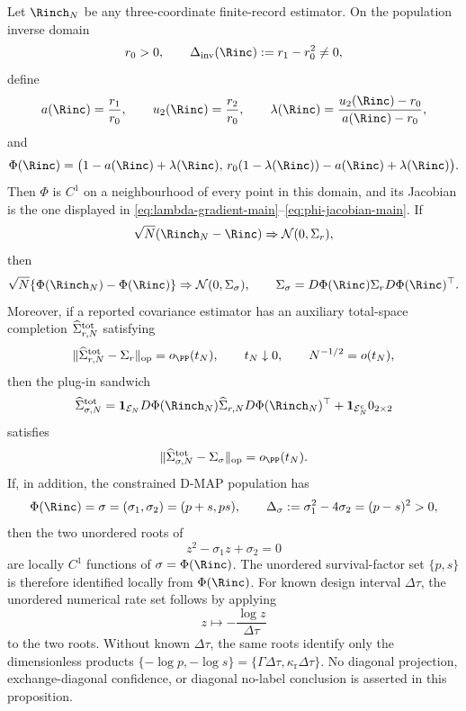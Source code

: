 \begin{proposition}\label{prop:finite-record-pre-diagonal-quotient-rule-main}
Let \(\Rinch_N\) be any three-coordinate finite-record estimator.  On the
population inverse domain
\[
r_0>0,\qquad \Delta_{\mathrm{inv}}(\Rinc):=r_1-r_0^2\ne0,
\]
define
\[
a(\Rinc)=\frac{r_1}{r_0},\qquad
u_2(\Rinc)=\frac{r_2}{r_0},\qquad
\lambda(\Rinc)=\frac{u_2(\Rinc)-r_0}{a(\Rinc)-r_0},
\]
and
\begin{equation}\label{eq:finite-inverse-delta-map-main}
\Phi(\Rinc)=
\bigl(1-a(\Rinc)+\lambda(\Rinc),\,
r_0(1-\lambda(\Rinc))-a(\Rinc)+\lambda(\Rinc)\bigr).
\end{equation}
Then \(\Phi\) is \(C^1\) on a neighbourhood of every point in this domain, and
its Jacobian is the one displayed in
\eqref{eq:lambda-gradient-main}--\eqref{eq:phi-jacobian-main}.  If
\[
\sqrt N(\Rinch_N-\Rinc)\Rightarrow \mathcal N(0,\Sigma_r),
\]
then
\[
\sqrt N\{\Phi(\Rinch_N)-\Phi(\Rinc)\}
\Rightarrow
\mathcal N(0,\Sigma_{\sigma}),\qquad
\Sigma_{\sigma}=D\Phi(\Rinc)\Sigma_rD\Phi(\Rinc)^\top .
\]
Moreover, if a reported covariance estimator has an auxiliary total-space
completion \(\widehat\Sigma_{r,N}^{\rm tot}\) satisfying
\[
\|\widehat\Sigma_{r,N}^{\rm tot}-\Sigma_r\|_{\operatorname{op}}=o_{\PP}(t_N),
\qquad t_N\downarrow0,\qquad N^{-1/2}=o(t_N),
\]
then the plug-in sandwich
\[
\widehat\Sigma_{\sigma,N}^{\rm tot}
=\mathbf1_{\mathcal E_N}
D\Phi(\Rinch_N)\widehat\Sigma_{r,N}D\Phi(\Rinch_N)^\top
+\mathbf1_{\mathcal E_N^c}0_{2\times2}
\]
satisfies
\[
\|\widehat\Sigma_{\sigma,N}^{\rm tot}-\Sigma_{\sigma}\|_{\operatorname{op}}
=o_{\PP}(t_N).
\]
If, in addition, the constrained D-MAP population has
\[
\Phi(\Rinc)=\sigma=(\sigma_1,\sigma_2)=(p+s,ps),
\qquad
\Delta_\sigma:=\sigma_1^2-4\sigma_2=(p-s)^2>0,
\]
then the two unordered roots of
\[
z^2-\sigma_1z+\sigma_2=0
\]
are locally \(C^1\) functions of \(\sigma=\Phi(\Rinc)\).  The unordered
survival-factor set \(\{p,s\}\) is therefore identified locally from
\(\Phi(\Rinc)\).  For known design interval \(\Delta\tau\), the unordered
numerical rate set follows by applying
\[
z\longmapsto -\frac{\log z}{\Delta\tau}
\]
to the two roots.  Without known \(\Delta\tau\), the same roots identify only
the dimensionless products \(\{-\log p,-\log s\}
=\{\Gamma\Delta\tau,\kappa_{\mathrm r}\Delta\tau\}\).  No diagonal
projection, exchange-diagonal confidence, or diagonal no-label conclusion is
asserted in this proposition.

\end{proposition}

